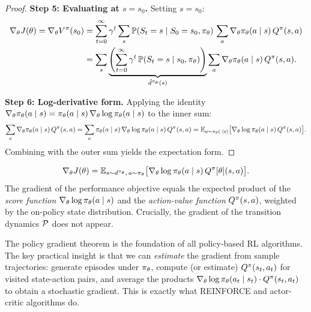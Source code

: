 \documentclass[11pt,a4paper]{article}
\begin{document}
\begin{proof}
\textbf{Step 5: Evaluating at $s = s_0$.}
Setting $s = s_0$:
\begin{align*}
  \nabla_\theta J(\theta)
  = \nabla_\theta V^{\pi}(s_0)
  &= \sum_{t=0}^{\infty} \gamma^t \sum_{s}
     \mathbb{P}(S_t = s \mid S_0 = s_0, \pi_\theta)\,
     \sum_a \nabla_\theta \pi_\theta(a \mid s)\, Q^{\pi}(s,a) \\
  &= \sum_s \underbrace{\left(\sum_{t=0}^{\infty} \gamma^t\,
     \mathbb{P}(S_t = s \mid s_0, \pi_\theta)
     \right)}_{\tilde{d}^{\pi_\theta}(s)}
     \sum_a \nabla_\theta \pi_\theta(a \mid s)\, Q^{\pi}(s,a).
\end{align*}

\textbf{Step 6: Log-derivative form.}
Applying the identity $\nabla_\theta \pi_\theta(a \mid s) =
\pi_\theta(a \mid s)\, \nabla_\theta \log \pi_\theta(a \mid s)$
to the inner sum:
\[
  \sum_a \nabla_\theta \pi_\theta(a \mid s)\, Q^{\pi}(s,a)
  = \sum_a \pi_\theta(a \mid s)\,
    \nabla_\theta \log \pi_\theta(a \mid s)\, Q^{\pi}(s,a)
  = \mathbb{E}_{a \sim \pi_\theta(\cdot \mid s)}
    \bigl[\nabla_\theta \log \pi_\theta(a \mid s)\, Q^{\pi}(s,a)\bigr].
\]
Combining with the outer sum yields the expectation form.
\end{proof}

\begin{keyresult}[title={Policy Gradient Theorem (Sutton et al., 2000)}]
\[
  \nabla_\theta J(\theta)
  = \mathbb{E}_{s \sim d^{\pi_\theta},\, a \sim \pi_\theta}
    \bigl[\nabla_\theta \log \pi_\theta(a \mid s)\, Q^{\pi}[\theta](s,a)\bigr].
\]
The gradient of the performance objective equals the expected product of
the \emph{score function} $\nabla_\theta \log \pi_\theta(a \mid s)$
and the \emph{action-value function} $Q^{\pi}(s,a)$, weighted by the
on-policy state distribution. Crucially, the gradient of the transition
dynamics $\mathcal{P}$ does not appear.
\end{keyresult}

\begin{rlconnection}
The policy gradient theorem is the foundation of all policy-based RL
algorithms. The key practical insight is that we can \emph{estimate} the
gradient from sample trajectories: generate episodes under $\pi_\theta$,
compute (or estimate) $Q^{\pi}(s_t, a_t)$ for visited state-action pairs,
and average the products
$\nabla_\theta \log \pi_\theta(a_t \mid s_t) \cdot Q^{\pi}(s_t, a_t)$
to obtain a stochastic gradient. This is exactly what REINFORCE and
actor-critic algorithms do.
\end{rlconnection}
\end{document}
